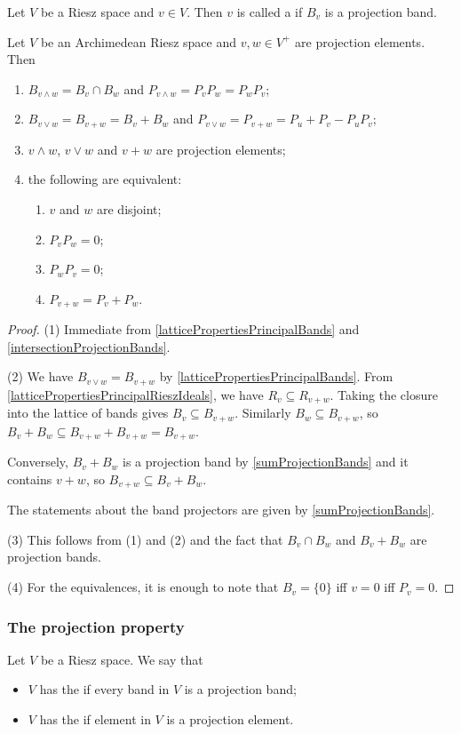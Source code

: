 \begin{definition}
Let $V$ be a Riesz space and $v\in V$. Then $v$ is called a  if $B_v$ is a projection band.
\end{definition}

\begin{proposition}
Let $V$ be an Archimedean Riesz space and $v,w\in V^+$ are projection elements. Then
\begin{enumerate}
\item $B_{v\wedge w} = B_v \cap B_w$ and $P_{v\wedge w} = P_vP_w = P_wP_v$;
\item $B_{v\vee w} = B_{v+w} = B_v + B_w$ and $P_{v\vee w} = P_{v+w} = P_u+P_v - P_uP_v$;
\item $v\wedge w$, $v\vee w$ and $v+w$ are projection elements;
\item the following are equivalent:
\begin{enumerate}
\item $v$ and $w$ are disjoint;
\item $P_vP_w = 0$;
\item $P_wP_v = 0$;
\item $P_{v+w} = P_v + P_w$.
\end{enumerate}
\end{enumerate}
\end{proposition}
\begin{proof}
(1) Immediate from \ref{latticePropertiesPrincipalBands} and \ref{intersectionProjectionBands}.

(2) We have $B_{v\vee w} = B_{v+w}$ by \ref{latticePropertiesPrincipalBands}. From \ref{latticePropertiesPrincipalRieszIdeals}, we have $R_{v} \subseteq R_{v+w}$. Taking the closure into the lattice of bands gives $B_{v} \subseteq B_{v+w}$. Similarly $B_w \subseteq B_{v+w}$, so $B_v + B_w \subseteq B_{v+w} + B_{v+w} = B_{v+w}$.

Conversely, $B_v+ B_w$ is a projection band by \ref{sumProjectionBands} and it contains $v+w$, so $B_{v+w} \subseteq B_v + B_w$.

The statements about the band projectors are given by \ref{sumProjectionBands}.

(3) This follows from (1) and (2) and the fact that $B_v \cap B_w$ and $B_v + B_w$ are projection bands.

(4) For the equivalences, it is enough to note that $B_v = \{0\}$ iff $v = 0$ iff $P_v = 0$.
\end{proof}

\subsubsection{The projection property}
\begin{definition}
Let $V$ be a Riesz space. We say that
\begin{itemize}
\item $V$ has the  if every band in $V$ is a projection band;
\item $V$ has the  if element in $V$ is a projection element.
\end{itemize}
\end{definition}


